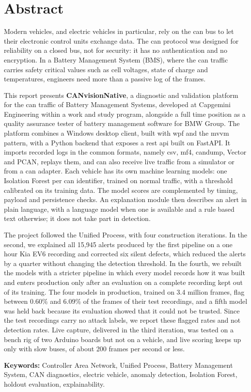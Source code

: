\chapter*{Abstract}

Modern vehicles, and electric vehicles in particular, rely on the \gls{can} bus to let their electronic control units exchange data. The \gls{can} protocol was designed for reliability on a closed bus, not for security: it has no authentication and no encryption. In a Battery Management System (BMS), where the \gls{can} traffic carries safety critical values such as cell voltages, state of charge and temperatures, engineers need more than a passive log of the frames.

This report presents \textbf{CANvisionNative}, a diagnostic and validation platform for the \gls{can} traffic of Battery Management Systems, developed at Capgemini Engineering within a work and study program, alongside a full time position as a quality assurance tester of battery management software for BMW Group. The platform combines a Windows desktop client, built with \gls{wpf} and the \gls{mvvm} pattern, with a Python backend that exposes a \gls{rest} \gls{api} built on FastAPI. It imports recorded logs in the common formats, namely \gls{csv}, \gls{mf4}, candump, Vector and PCAN, replays them, and can also receive live traffic from a simulator or from a \gls{can} adapter. Each vehicle has its own machine learning models: one Isolation Forest per \gls{can} identifier, trained on normal traffic, with a threshold calibrated on its training data. The model scores are complemented by timing, payload and persistence checks. An explanation module then describes an alert in plain language, with a language model when one is available and a rule based text otherwise; it does not take part in detection.

The project followed the Unified Process, with four construction iterations. In the second, we explained all 15{,}945 alerts produced by the first pipeline on a one hour Kia EV6 recording and corrected six silent defects, which reduced the alerts by a quarter without changing the detection threshold. In the fourth, we rebuilt the models with a stricter pipeline in which every model records how it was built and enters production only after an evaluation on a complete recording kept out of its training. The four models in production, trained on 3.4 million frames, flag between 0.60\% and 6.09\% of the frames of their test recordings, and a fifth model was held back because its evaluation showed that it could not be trusted. Since the test recordings carry no attack labels, we report these flagged rates and not detection rates. Live capture, delivered in the third iteration, was tested on a bench rig of two Arduino boards but not on a vehicle, and live scoring keeps up only with slow buses, of about 200 frames per second or less.

\vspace{0.5cm}
\noindent\textbf{Keywords:} Controller Area Network, Unified Process, Battery Management System, CAN diagnostics, electric vehicle, anomaly detection, Isolation Forest, holdout evaluation, explainability.

\cleardoublepage
